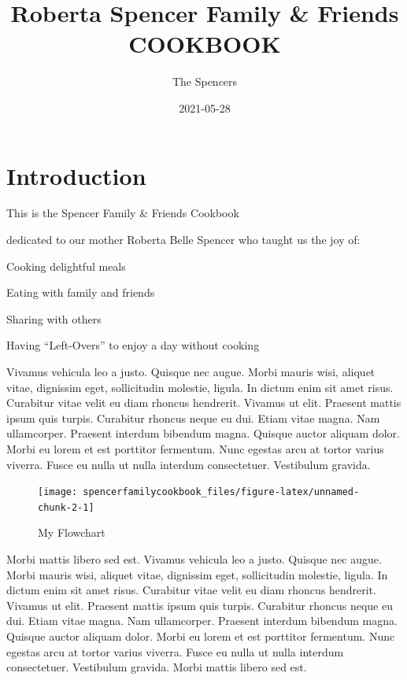 \documentclass[
]{book}
\title{Roberta Spencer Family \& Friends COOKBOOK}
\author{The Spencers}
\date{2021-05-28}
\begin{document}
\maketitle

{
\setcounter{tocdepth}{1}
\tableofcontents
}
\hypertarget{introduction}{%
\chapter{Introduction}\label{introduction}}

This is the Spencer Family \& Friends Cookbook

dedicated to our mother Roberta Belle Spencer who taught us the joy of:

Cooking delightful meals

Eating with family and friends

Sharing with others

Having ``Left-Overs'' to enjoy a day without cooking

Vivamus vehicula leo a justo. Quisque nec augue. Morbi mauris wisi, aliquet vitae, dignissim eget, sollicitudin molestie, ligula. In dictum enim sit amet risus. Curabitur vitae velit eu diam rhoncus hendrerit. Vivamus ut elit. Praesent mattis ipsum quis turpis. Curabitur rhoncus neque eu dui. Etiam vitae magna. Nam ullamcorper. Praesent interdum bibendum magna. Quisque auctor aliquam dolor. Morbi eu lorem et est porttitor fermentum. Nunc egestas arcu at tortor varius viverra. Fusce eu nulla ut nulla interdum consectetuer. Vestibulum gravida.

\begin{figure}

\hfill{}\texttt{[image: spencerfamilycookbook\_files/figure-latex/unnamed-chunk-2-1]} 

\caption{My Flowchart}\label{fig:unnamed-chunk-2}
\end{figure}

Morbi mattis libero sed est. Vivamus vehicula leo a justo. Quisque nec augue. Morbi mauris wisi, aliquet vitae, dignissim eget, sollicitudin molestie, ligula. In dictum enim sit amet risus. Curabitur vitae velit eu diam rhoncus hendrerit. Vivamus ut elit. Praesent mattis ipsum quis turpis. Curabitur rhoncus neque eu dui. Etiam vitae magna. Nam ullamcorper. Praesent interdum bibendum magna. Quisque auctor aliquam dolor. Morbi eu lorem et est porttitor fermentum. Nunc egestas arcu at tortor varius viverra. Fusce eu nulla ut nulla interdum consectetuer. Vestibulum gravida. Morbi mattis libero sed est.
\end{document}
